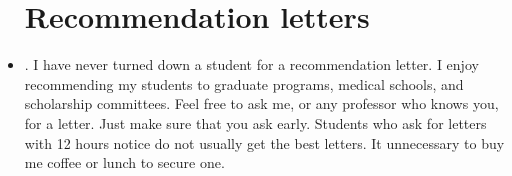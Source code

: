 \begin{itemize}
\section{Recommendation letters}

\item {}. I have never turned down a student for a recommendation letter. I enjoy recommending my students to graduate programs, medical schools, and scholarship committees. Feel free to ask me, or any professor who knows you, for a letter. Just make sure that you ask early. Students who ask for letters with 12 hours notice do not usually get the best letters. It unnecessary to buy me coffee or lunch to secure one.

\end{itemize}
